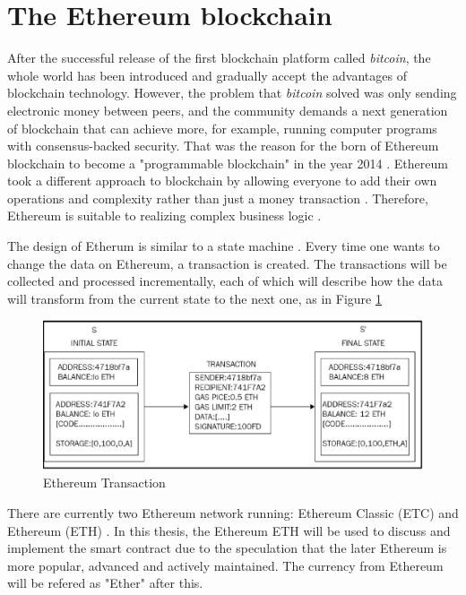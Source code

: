 \documentclass[twoside,numperchapter]{tutthesis} %
\begin{document}
\section{The Ethereum blockchain}

After the successful release of the first blockchain platform called \textit{bitcoin}, the whole world has been introduced and gradually accept the advantages of blockchain technology. However, the problem that \textit{bitcoin} solved was only sending electronic money between peers, and the community demands a next generation of blockchain that can achieve more, for example, running computer programs with consensus-backed security. That was the reason for the born of Ethereum blockchain to become a "programmable blockchain" in the year 2014 \citep{Ethdocorg:WhatIsEthereum}. Ethereum took a different approach to blockchain by allowing everyone to add their own operations and complexity rather than just a money transaction \citep{RefWorks:doc:MasteringBlockchain}. Therefore, Ethereum is suitable to realizing complex business logic \citep{RefWorks:doc:EthereumStateOfKnowledge}.

The design of Etherum is similar to a state machine \citep{RefWorks:doc:EthereumStateOfKnowledge}\citep{RefWorks:doc:MasteringBlockchain}\citep{RefWorks:doc:EthereumASecureDecentralizedTransaction}. Every time one wants to change the data on Ethereum, a transaction is created. The transactions will be collected and processed incrementally, each of which will describe how the data will transform from the current state to the next one, as in Figure \ref{fig:ethereum_transaction}

\begin{figure}
    \centering
    \includegraphics[width=\linewidth]{ethereum_transaction.jpg}
    \caption{Ethereum Transaction \citep{RefWorks:doc:MasteringBlockchain}}
    \label{fig:ethereum_transaction}
\end{figure}

There are currently two Ethereum network running: Ethereum Classic (ETC) \citep{EthereumClassic} and Ethereum (ETH) \citep{Ethereum}. In this thesis, the Ethereum ETH will be used to discuss and implement the smart contract due to the speculation that the later Ethereum is more popular, advanced and actively maintained. The currency from Ethereum will be refered as "Ether" after this.
\end{document}
